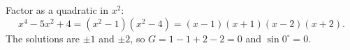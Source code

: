 Factor as a quadratic in $x^2$:
\[x^4-5x^2+4=\left(x^2-1\right)\left(x^2-4\right)=(x-1)(x+1)(x-2)(x+2).\]
The solutions are $\pm1$ and $\pm2$, so $G=1-1+2-2=0$ and $\sin0^\circ=\boxed{0}$.
